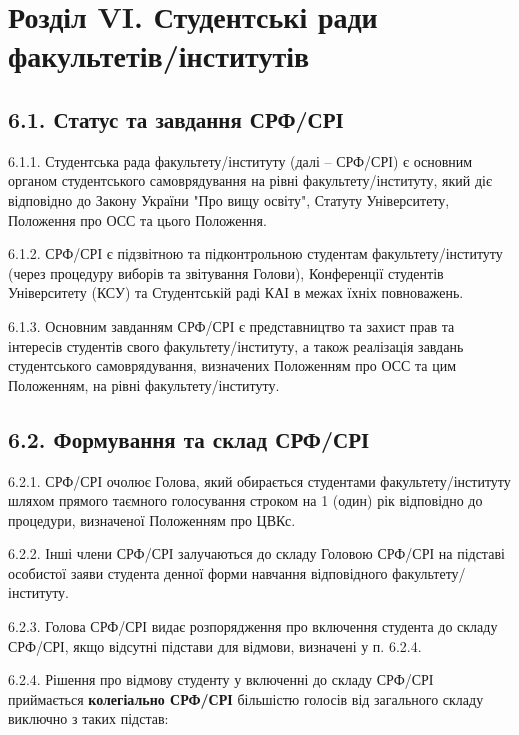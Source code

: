 \section*{Розділ VI. Студентські ради факультетів/інститутів}

\subsection*{6.1. Статус та завдання СРФ/СРІ}
    6.1.1. Студентська рада факультету/інституту (далі – СРФ/СРІ) є основним органом студентського самоврядування на рівні факультету/інституту, який діє відповідно до Закону України "Про вищу освіту", Статуту Університету, Положення про ОСС та цього Положення.

    6.1.2. СРФ/СРІ є підзвітною та підконтрольною студентам факультету/інституту (через процедуру виборів та звітування Голови), Конференції студентів Університету (КСУ) та Студентській раді КАІ в межах їхніх повноважень.

    6.1.3. Основним завданням СРФ/СРІ є представництво та захист прав та інтересів студентів свого факультету/інституту, а також реалізація завдань студентського самоврядування, визначених Положенням про ОСС та цим Положенням, на рівні факультету/інституту.

\subsection*{6.2. Формування та склад СРФ/СРІ}
    6.2.1. СРФ/СРІ очолює Голова, який обирається студентами факультету/інституту шляхом прямого таємного голосування строком на 1 (один) рік відповідно до процедури, визначеної Положенням про ЦВКс.

    6.2.2. Інші члени СРФ/СРІ залучаються до складу Головою СРФ/СРІ на підставі особистої заяви студента денної форми навчання відповідного факультету/інституту.

    6.2.3. Голова СРФ/СРІ видає розпорядження про включення студента до складу СРФ/СРІ, якщо відсутні підстави для відмови, визначені у п. 6.2.4.

    6.2.4. Рішення про відмову студенту у включенні до складу СРФ/СРІ приймається \textbf{колегіально СРФ/СРІ} більшістю голосів від загального складу виключно з таких підстав:

